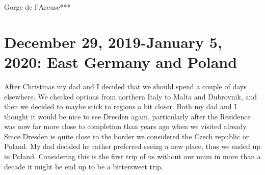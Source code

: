 Gorge de l'Areuse***\\

\section{December 29, 2019-January 5, 2020: East Germany and Poland}
\label{2019:GermanyPoland}

After Christmas my dad and I decided that we should spend a couple of days elsewhere. We checked options from northern Italy to Malta and Dubrovnik, and then we decided to maybe stick to regions a bit closer. Both my dad and I thought it would be nice to see Dresden again, particularly after the Residence was now far more close to completion than years ago when we visited already. Since Dresden is quite close to the border we considered the Czech republic or Poland. My dad decided he rather preferred seeing a new place, thus we ended up in Poland. Considering this is the first trip of us without our mum in more than a decade it might be end up to be a bittersweet trip.\\


